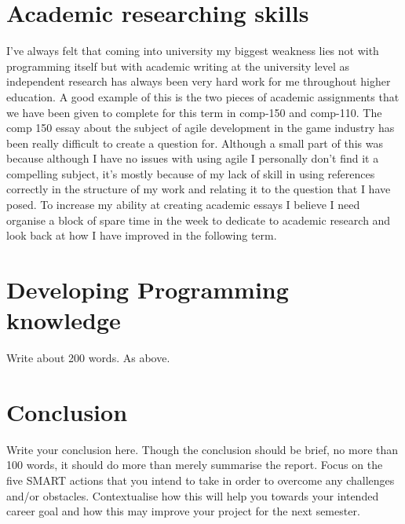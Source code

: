 \documentclass{scrartcl}
\begin{document}
\section{Academic researching skills}

I've always felt that coming into university my biggest weakness lies not with programming itself but with academic writing at the university level as independent research has always been very hard work for me throughout higher education. A good example of this is the two pieces of academic assignments that we have been given to complete for this term in comp-150 and comp-110. The comp 150 essay about the subject of agile development in the game industry has been really difficult to create a question for. Although a small part of this was because although I have no issues with using agile I personally don't find it a compelling subject, it's mostly because of my lack of skill in using references correctly in the structure of my work and relating it to the question that I have posed. To increase my ability at creating academic essays I believe I need organise a block of spare time in the week to dedicate to academic research and look back at how I have improved in the following term.
\section{Developing Programming knowledge}

Write about 200 words. As above.


\section{Conclusion}

Write your conclusion here. Though the conclusion should be brief, no more than 100 words, it should do more than merely summarise the report. Focus on the five SMART actions that you intend to take in order to overcome any challenges and/or obstacles. Contextualise how this will help you towards your intended career goal and how this may improve your project for the next semester.



\end{document}
